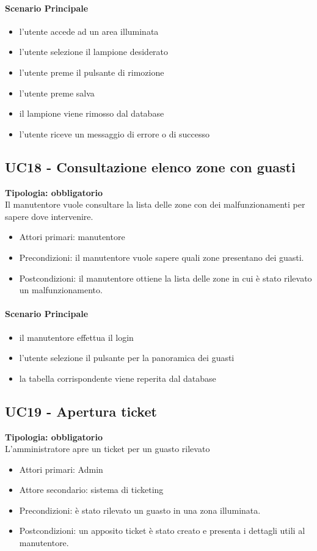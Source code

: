 \documentclass[12pt]{article}
\begin{document}
\paragraph{Scenario Principale}
\begin{itemize}
	\item l'utente accede ad un area illuminata
	\item l'utente selezione il lampione desiderato
	\item l'utente preme il pulsante di rimozione
	\item l'utente preme salva
	\item il lampione viene rimosso dal database
	\item l'utente riceve un messaggio di errore o di successo
\end{itemize}


\subsection{UC18 - Consultazione elenco zone con guasti}
\textbf{Tipologia: obbligatorio}\\
Il manutentore vuole consultare la lista delle zone con dei malfunzionamenti per sapere dove intervenire.
\begin{itemize}
	\item Attori primari: manutentore
	\item Precondizioni: il manutentore vuole sapere quali zone presentano dei guasti.\\
	\item Postcondizioni: il manutentore ottiene la lista delle zone in cui è stato rilevato un malfunzionamento.
\end{itemize}
\paragraph{Scenario Principale}
\begin{itemize}
	\item il manutentore effettua il login
	\item l'utente selezione il pulsante per la panoramica dei guasti
	\item la tabella corrispondente viene reperita dal database
\end{itemize}


\subsection{UC19 - Apertura ticket}
\textbf{Tipologia: obbligatorio}\\
L'amministratore apre un ticket per un guasto rilevato
\begin{itemize}
	\item Attori primari: Admin
	\item Attore secondario: sistema di ticketing
	\item Precondizioni: è stato rilevato un guasto in una zona illuminata.
	\item Postcondizioni: un apposito ticket è stato creato e presenta i dettagli utili al manutentore.
\end{itemize}
\end{document}
